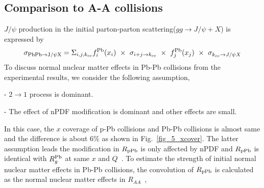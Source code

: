 \clearpage
\subsection{Comparison to A-A collisions}
$J/\psi$ production in the initial parton-parton scattering($gg\rightarrow J/\psi+X$) is expressed by
\begin{equation}
  \sigma_{\rm{PbPb} \rightarrow J/\psi X} = \Sigma_{i, j, k_{cc}} f_{i}^{\rm{Pb}}(x_{i}) ~\times ~\sigma_{i+j\rightarrow k_{cc}} ~\times ~f_{j}^{\rm{Pb}}(x_{j}) ~\times ~\sigma_{k_{cc}\rightarrow J/\psi X}
\end{equation}
To discuss normal nuclear matter effects in Pb-Pb collisions from the experimental results, we consider the following assumption,  
\begin{description}
	\item{-}  $2\rightarrow 1$ process is dominant. 
	\item{-}  The effect of nPDF modification is dominant and other effects are small. 
\end{description}
In this case, the $x$ coverage of p-Pb collisions and Pb-Pb collisions  is almost same and the difference is about 6\% as shown in Fig.~\ref{fig_5_xcover}.
The latter assumption leads the modification in $R_{\rm{pPb}}$ is only affected by nPDF and $R_{\rm{pPb}}$ is identical with $R_{g}^{\rm{Pb}}$ at same $x$ and $Q$~\cite{bib_shadow}.
To estimate the strength of initial normal nuclear matter effects in Pb-Pb collisions, the convolution of $R_{\rm{pPb}}$ is calculated as the normal nuclear matter effects in $R_{AA}$~\cite{bib_shadowf},  
